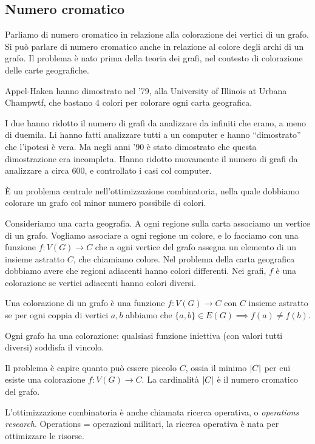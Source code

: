 \subsection{Numero cromatico}

Parliamo di numero cromatico in relazione alla colorazione dei vertici di un grafo.
Si pu\`o parlare di numero cromatico anche in relazione al colore degli archi di un grafo.
Il problema \`e nato prima della teoria dei grafi, nel contesto di colorazione delle carte geografiche.

Appel-Haken hanno dimostrato nel '79, alla University of Illinois at Urbana Champwtf, che bastano 4 colori per colorare ogni carta geografica.

I due hanno ridotto il numero di grafi da analizzare da infiniti che erano, a meno di duemila.
Li hanno fatti analizzare tutti a un computer e hanno ``dimostrato'' che l'ipotesi \`e vera.
Ma negli anni '90 \`e stato dimostrato che questa dimostrazione era incompleta.
Hanno ridotto nuovamente il numero di grafi da analizzare a circa 600, e controllato i casi col computer.

\`E un problema centrale nell'ottimizzazione combinatoria, nella quale dobbiamo colorare un grafo col minor numero possibile di colori.

Consideriamo una carta geografia.
A ogni regione sulla carta associamo un vertice di un grafo.
Vogliamo associare a ogni regione un colore, e lo facciamo con una funzione $f: V(G) \to C$ che a ogni vertice del grafo assegna un elemento di un insieme astratto $C$, che chiamiamo colore.
Nel problema della carta geografica dobbiamo avere che regioni adiacenti hanno colori differenti.
Nei grafi, $f$ \`e una colorazione se vertici adiacenti hanno colori diversi.

\begin{defn}
Una colorazione di un grafo \`e una funzione $f : V(G) \to C$ con $C$ insieme astratto se per ogni coppia di vertici $a,b$ abbiamo che $\{a,b\} \in E(G) \implies f(a) \neq f(b)$.
\end{defn}
Ogni grafo ha una colorazione: qualsiasi funzione iniettiva (con valori tutti diversi) soddisfa il vincolo.

Il problema \`e capire quanto pu\`o essere piccolo $C$, ossia il minimo $\left\lvert{C}\right\rvert$ per cui esiste una colorazione $f : V(G) \to C$.
La cardinalit\`a $\left\lvert{C}\right\rvert$ \`e il numero cromatico del grafo.

L'ottimizzazione combinatoria \`e anche chiamata ricerca operativa, o \emph{operations research}.
Operations = operazioni militari, la ricerca operativa \`e nata per ottimizzare le risorse.
